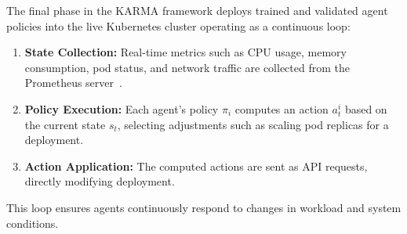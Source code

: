 \documentclass[conference]{IEEEtran}
\begin{document}

The final phase in the KARMA framework deploys trained and validated agent policies into the live Kubernetes cluster operating as a continuous loop:
\begin{enumerate}
    \item \textbf{State Collection:} Real-time metrics such as CPU usage, memory consumption, pod status, and network traffic are collected from the Prometheus server~\cite{prometheus}.
    \item \textbf{Policy Execution:} Each agent's policy $\pi_i$ computes an action $a_t^i$ based on the current state $s_t$, selecting adjustments such as scaling pod replicas for a deployment.
    \item \textbf{Action Application:} The computed actions are sent as API requests, directly modifying deployment.
\end{enumerate}
This loop ensures agents continuously respond to changes in workload and system conditions.
%


\end{document}
